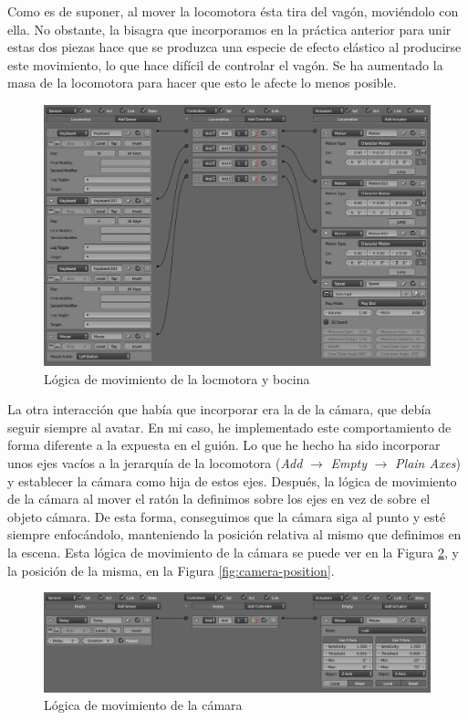 \documentclass{article}
\begin{document}
Como es de suponer, al mover la locomotora ésta tira del vagón, moviéndolo con
ella. No obstante, la bisagra que incorporamos en la práctica anterior para unir
estas dos piezas hace que se produzca una especie de efecto elástico al
producirse este movimiento, lo que hace difícil de controlar el vagón. Se ha
aumentado la masa de la locomotora para hacer que esto le afecte lo menos
posible.

\begin{figure}
    \centering
    \includegraphics[width=\textwidth]{images/locomotive-logic.png}
    \caption{Lógica de movimiento de la locmotora y bocina}
    \label{fig:locomotive}
\end{figure}

La otra interacción que había que incorporar era la de la cámara, que debía
seguir siempre al avatar. En mi caso, he implementado este comportamiento de
forma diferente a la expuesta en el guión. Lo que he hecho ha sido incorporar
unos ejes vacíos a la jerarquía de la locomotora (\textit{Add} $\rightarrow$
\textit{Empty} $\rightarrow$ \textit{Plain Axes}) y establecer la cámara como
hija de estos ejes. Después, la lógica de movimiento de la cámara al mover el
ratón la definimos sobre los ejes en vez de sobre el objeto cámara. De esta
forma, conseguimos que la cámara siga al punto y esté siempre enfocándolo,
manteniendo la posición relativa al mismo que definimos en la escena. Esta
lógica de movimiento de la cámara se puede ver en la Figura \ref{fig:camera}, y
la posición de la misma, en la Figura \ref{fig:camera-position}.

\begin{figure}
    \centering
    \includegraphics[width=\textwidth]{images/camera-logic.png}
    \caption{Lógica de movimiento de la cámara}
    \label{fig:camera}
\end{figure}
\end{document}
